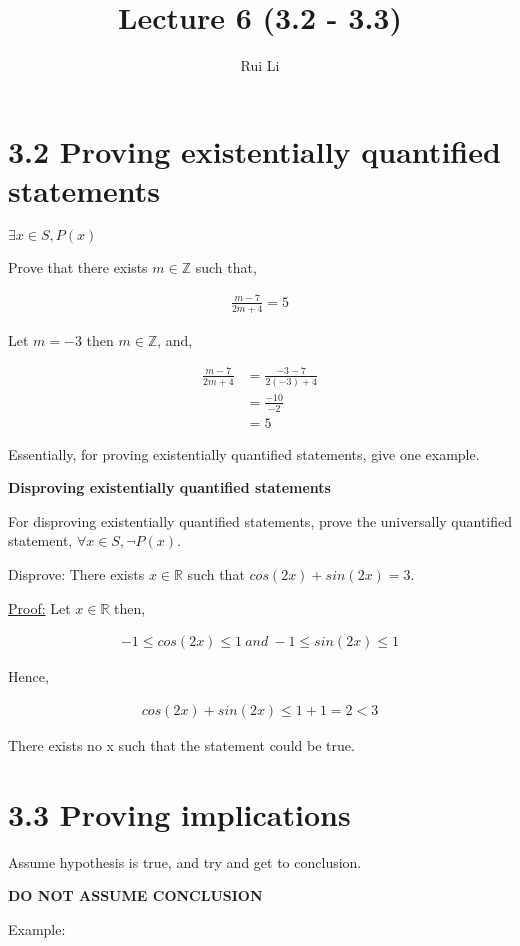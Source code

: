 \documentclass[11pt]{article}
\title{Lecture 6 (3.2 - 3.3)}
\author{Rui Li}
\begin{document}
\maketitle
\tableofcontents

\section*{3.2 Proving existentially quantified statements}

$\exists x \in S, P(x)$

Prove that there exists $m \in \mathbb{Z}$ such that,

\begin{align*}
    \frac{m-7}{2m+4} = 5
\end{align*}

Let $m = -3$ then $m \in \mathbb{Z}$, and,

\begin{align*}
    \frac{m-7}{2m+4} &= \frac{-3-7}{2(-3)+4}\\
    &= \frac{-10}{-2}\\
    &= 5
\end{align*}

Essentially, for proving existentially quantified statements, give one example.

\bigskip

\textbf{Disproving existentially quantified statements}

\medskip

For disproving existentially quantified statements, prove the universally quantified statement, $\forall x \in S, \neg P(x)$.

\medskip

Disprove: There exists $x \in \mathbb{R}$ such that $cos(2x) + sin(2x) = 3$.

\underline{Proof:} Let $x \in \mathbb{R}$ then,

\begin{align*}
    -1 \leq cos(2x) \leq 1\ and\ -1 \leq sin(2x) \leq 1
\end{align*}

Hence,

\begin{align*}
    cos(2x) + sin(2x) \leq 1+1 = 2 < 3
\end{align*}

There exists no x such that the statement could be true.

\section*{3.3 Proving implications}

Assume hypothesis is true, and try and get to conclusion.

\textbf{DO NOT ASSUME CONCLUSION}

\medskip

Example:
\end{document}
